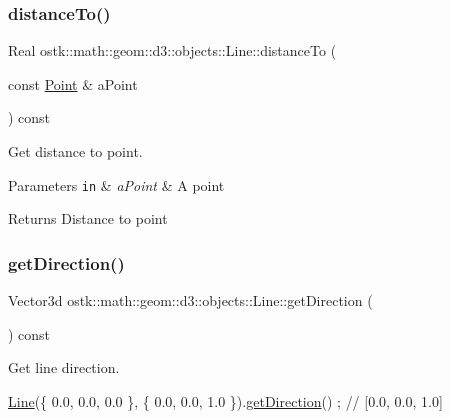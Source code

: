 \subsubsection{\texorpdfstring{distance\+To()}{distanceTo()}}
{\footnotesize\ttfamily Real ostk\+::math\+::geom\+::d3\+::objects\+::\+Line\+::distance\+To (\begin{DoxyParamCaption}\item[{const \hyperlink{classostk_1_1math_1_1geom_1_1d3_1_1objects_1_1_point}{Point} \&}]{a\+Point }\end{DoxyParamCaption}) const}



Get distance to point. 


\begin{DoxyParams}[1]{Parameters}
\mbox{\tt in}  & {\em a\+Point} & A point \\
\hline
\end{DoxyParams}
\begin{DoxyReturn}{Returns}
Distance to point 
\end{DoxyReturn}
\mbox{\label{classostk_1_1math_1_1geom_1_1d3_1_1objects_1_1_line_a7f312d93308a5f0a876d69c46662838b}} 
\subsubsection{\texorpdfstring{get\+Direction()}{getDirection()}}
{\footnotesize\ttfamily Vector3d ostk\+::math\+::geom\+::d3\+::objects\+::\+Line\+::get\+Direction (\begin{DoxyParamCaption}{ }\end{DoxyParamCaption}) const}



Get line direction. 


\begin{DoxyCode}
\hyperlink{classostk_1_1math_1_1geom_1_1d3_1_1objects_1_1_line_a9ebdaaf67a4bd91780808f8683463ebe}{Line}(\{ 0.0, 0.0, 0.0 \}, \{ 0.0, 0.0, 1.0 \}).\hyperlink{classostk_1_1math_1_1geom_1_1d3_1_1objects_1_1_line_a7f312d93308a5f0a876d69c46662838b}{getDirection}() ; \textcolor{comment}{// [0.0, 0.0, 1.0]}
\end{DoxyCode}


